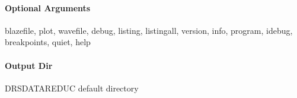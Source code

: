 \documentclass[a4paper,10pt,english]{report}
\begin{document}
\paragraph{Optional Arguments}
\label{\detokenize{user/spirou/recipes/polar:optional-arguments}}
\begin{sphinxVerbatim}[commandchars=\\\{\}]
\PYGZhy{}\PYGZhy{}blazefile, \PYGZhy{}\PYGZhy{}plot, \PYGZhy{}\PYGZhy{}wavefile,
\PYGZhy{}\PYGZhy{}debug, \PYGZhy{}\PYGZhy{}listing, \PYGZhy{}\PYGZhy{}listingall, \PYGZhy{}\PYGZhy{}version, \PYGZhy{}\PYGZhy{}info,
\PYGZhy{}\PYGZhy{}program, \PYGZhy{}\PYGZhy{}idebug, \PYGZhy{}\PYGZhy{}breakpoints, \PYGZhy{}\PYGZhy{}quiet, \PYGZhy{}\PYGZhy{}help
\end{sphinxVerbatim}


\paragraph{Output Dir}
\label{\detokenize{user/spirou/recipes/polar:output-dir}}
\begin{sphinxVerbatim}[commandchars=\\\{\}]
DRS\PYGZus{}DATA\PYGZus{}REDUC    default  directory
\end{sphinxVerbatim}
\end{document}
